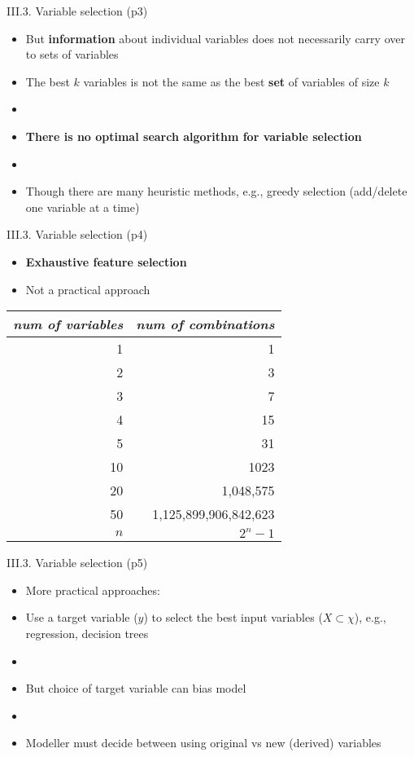 \documentclass[handout]{beamer}
\newcommand{\strong}[1]{\textbf{\color{teal} #1}}
\newcommand{\stronger}[1]{\textbf{\color{purple} #1}}
\begin{document}
\begin{frame}{III.3. Variable selection (p3)}
\begin{itemize}
\item But \strong{information} about individual variables does not necessarily carry over to sets of variables
\item The best $k$ variables is not the same as the best \strong{set} of variables of size $k$
\item[]
\item \textbf{There is no optimal search algorithm for variable selection}
\item[]
\item Though there are many heuristic methods,
e.g., greedy selection (add/delete one variable at a time)
\end{itemize}
\end{frame}
\begin{frame}{III.3. Variable selection (p4)}
\begin{itemize}
\item[] \stronger{Exhaustive feature selection}
\item Not a practical approach
\end{itemize}
\begin{center}
\begin{tabular}{|r|r|}
\emph{num of variables} & \emph{num of combinations} \\
\hline
1 & 1 \\
2 & 3 \\
3 & 7 \\
4 & 15 \\
5 & 31 \\
\hline
10 & 1023 \\
\hline
20 & 1,048,575 \\
\hline
50 & 1,125,899,906,842,623 \\
\hline
$n$ & $2^n - 1$ \\
\hline
\end{tabular}
\end{center}
\end{frame}
\begin{frame}{III.3. Variable selection (p5)}
\begin{itemize}
\item[] More practical approaches:
\item Use a target variable ($y$) to select the best input variables ($X \subset \chi$), e.g., regression, decision trees
\item[]
\item But choice of target variable can bias model
\item[]
\item Modeller must decide between using original vs new (derived) variables
\end{itemize}
\end{frame}
\end{document}
